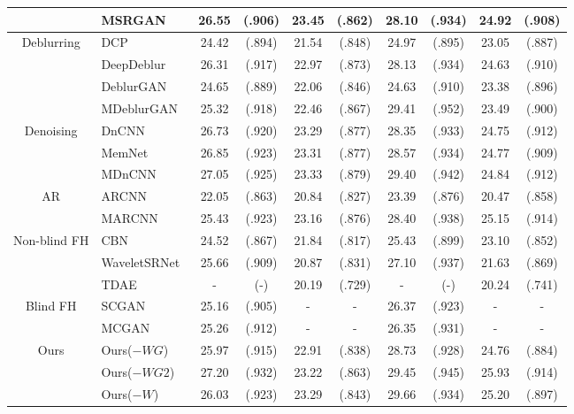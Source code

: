 \documentclass[runningheads]{llncs}
\begin{document}
\begin{table*}[t]
{\begin{center}
\begin{tabular}{ c| l|c c c  c|c c c c}
&MSRGAN& 26.55 & (.906) &  {\color{blue}23.45} & (.862) & 28.10 & (.934) & 24.92 & (.908)\\
				\hline
				\multirow{4}{*}{Deblurring}&DCP~\cite{pan2016blind}& 24.42 & (.894) & 21.54 &(.848) & 24.97 & (.895) & 23.05 &(.887)\\
				&DeepDeblur~\cite{Nah2017CVPR}& 26.31 & (.917) & 22.97 &(.873) & 28.13 & (.934) & 24.63 &(.910)\\
				&DeblurGAN~\cite{DeblurGAN}& 24.65 & (.889) & 22.06 &(.846) & 24.63 & (.910) & 23.38 &(.896)\\
				&MDeblurGAN& 25.32 & (.918) & 22.46 &(.867) & {\color{blue}29.41} & ({\color{blue}.952}) & 23.49 &(.900)\\
				\hline
				\multirow{3}{*}{Denoising}&DnCNN~\cite{zhang2017beyond}& 26.73 & (.920) & 23.29 &(.877) & 28.35 & (.933) & 24.75 &(.912)\\
				&MemNet~\cite{MemNet}& 26.85 & (.923) & 23.31 &(.877) & 28.57 & (.934) & 24.77 &(.909)\\
                &MDnCNN& {\color{blue}27.05} & ({\color{blue}.925}) & 23.33 &({\color{blue}.879}) & 29.40 & (.942) & 24.84 &(.912)\\
				\hline
				\multirow{2}{*}{AR}&ARCNN~\cite{Dong2015ICCV}& 22.05 & (.863) & 20.84 &(.827) & 23.39 & (.876) & 20.47 &(.858)\\
				&MARCNN& 25.43 & (.923) & 23.16 &(.876) & 28.40 & (.938) & {\color{blue}25.15} &({\color{blue}.914})\\
				\hline
				\multirow{3}{*}{Non-blind FH}&CBN~\cite{zhu2016deep}& 24.52 & (.867)& 21.84 & (.817)& 25.43 & (.899) & 23.10 & (.852)\\
				&WaveletSRNet~\cite{huang2017wavelet}& 25.66 & (.909) & 20.87 &(.831) & 27.10 & (.937) & 21.63 &(.869)\\
				&TDAE~\cite{yu2017hallucinating}& - & (-) & 20.19 &(.729) & - & (-) & 20.24 &(.741)\\
				\hline
				\multirow{2}{*}{Blind FH}&SCGAN~\cite{xu2017learning}& 25.16 & (.905) & - & -& 26.37 & (.923) & - & -\\
				&MCGAN~\cite{xu2017learning}& 25.26 & (.912) & - & -& 26.35 & (.931) & - & - \\
				\hline
				\multirow{7}{*}{Ours}&Ours($-WG$)& 25.97 & (.915) & 22.91 & (.838) & 28.73 & (.928) & 24.76 & (.884)\\
				&Ours($-WG2$)& 27.20 & (.932) & 23.22 & (.863) & 29.45 & (.945) & 25.93 & (.914)\\
				&Ours($-W$) & 26.03 & (.923) & 23.29 & (.843) & 29.66 & (.934) & 25.20 & (.897)\\

\end{tabular}
\end{center}}
\end{table*}
\end{document}
